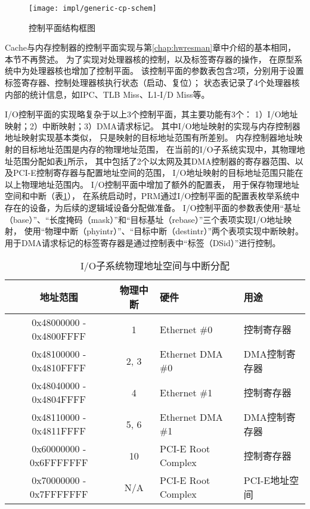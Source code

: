 \begin{figure}[htb]
  \centering
  \texttt{[image: impl/generic-cp-schem]}
  \caption{控制平面结构框图}
  \label{fig:generic-cp-schem}
\end{figure}

Cache与内存控制器的控制平面实现与第\ref{chap:hwresman}章中介绍的基本相同，
本节不再赘述。
为了实现对处理器核的控制，以及标签寄存器的操作，
在原型系统中为处理器核也增加了控制平面。
该控制平面的参数表包含2项，分别用于设置标签寄存器、控制处理器核执行状态（启动、复位）；
状态表记录了4个处理器核内部的统计信息，如IPC、TLB Miss、L1-I/D Miss等。

I/O控制平面的实现略复杂于以上3个控制平面，其主要功能有3个：
1）I/O地址映射；2）中断映射；3）DMA请求标记。
其中I/O地址映射的实现与内存控制器地址映射实现基本类似，
只是映射的目标地址范围有所差别。
内存控制器地址映射的目标地址范围是内存的物理地址范围，
在当前的I/O子系统实现中，其物理地址范围分配如表\ref{tab:pard-io-phyconfig}所示，
其中包括了2个以太网及其DMA控制器的寄存器范围、以及PCI-E控制寄存器与配置地址空间的范围，
I/O地址映射的目标地址范围只能在以上物理地址范围内。
I/O控制平面中增加了额外的配置表，
用于保存物理地址空间和中断（表\ref{tab:pard-io-phyconfig}），
在系统启动时，PRM通过I/O控制平面的配置表枚举系统中存在的设备，为后续的逻辑域设备分配做准备。
I/O控制平面的参数表使用``基址（base）''、``长度掩码（mask）''和``目标基址（rebase）''三个表项实现I/O地址映射，
使用``物理中断（phyintr）''、``目标中断（destintr）''两个表项实现中断映射。
用于DMA请求标记的标签寄存器是通过控制表中``标签（DSid）''进行控制。

\begin{table}[htb]
  \centering
  \begin{minipage}[t]{0.9\linewidth}
  \caption{I/O子系统物理地址空间与中断分配}
  \label{tab:pard-io-phyconfig}
    \begin{tabular*}{\linewidth}{ccll}
      \toprule[1.5pt]
      \textbf{地址范围} & \textbf{物理中断} & \textbf{硬件} & \textbf{用途} \\
      \midrule[1pt]
      0x48000000 - 0x4800FFFF & 1    & Ethernet \#0       & 控制寄存器    \\
      0x48100000 - 0x4810FFFF & 2, 3 & Ethernet DMA \#0   & DMA控制寄存器 \\
      0x48040000 - 0x4804FFFF & 4    & Ethernet \#1       & 控制寄存器    \\
      0x48110000 - 0x4811FFFF & 5, 6 & Ethernet DMA \#1   & DMA控制寄存器 \\
      0x60000000 - 0x6FFFFFFF & 10   & PCI-E Root Complex & 控制寄存器    \\
      0x70000000 - 0x7FFFFFFF & N/A  & PCI-E Root Complex & PCI-E地址空间 \\
      \bottomrule[1.5pt]
    \end{tabular*}\\[2pt]
  \end{minipage}
\end{table}


